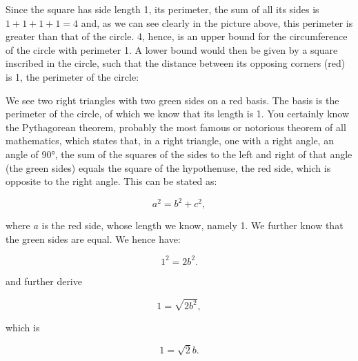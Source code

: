 \documentclass[tikz]{scrreprt}
\begin{document}
\begin{center}
\end{center}

Since the square has side length 1,
its perimeter, the sum of all its sides is
$1+1+1+1 = 4$ and, as we can see clearly
in the picture above, this perimeter
is greater than that of the circle.
4, hence, is an upper bound for the circumference
of the circle with perimeter 1.
A lower bound would then be given
by a square inscribed in the circle,
such that the distance between 
its opposing corners (red) is 1, the perimeter
of the circle:

\begin{center}
\end{center}

We see two right triangles with two green sides 
on a red basis. The basis is the perimeter
of the circle, of which we know that its length is 1.
You certainly know the Pythagorean theorem,
probably the most famous or notorious theorem of all mathematics,
which states that, in a right triangle,
one with a right angle, an angle of 90°, the sum of the squares
of the sides to the left and right of that angle (the green sides)
equals the square of the hypothenuse, the red side,
which is opposite to the right angle.
This can be stated as:

\begin{equation}
a^2 = b^2 + c^2,
\end{equation}

where $a$ is the red side, whose length we know,
namely 1. We further know that the green sides
are equal. We hence have:

\begin{equation}
1^2 = 2b^2.
\end{equation}

and further derive

\begin{equation}
1 = \sqrt{2b^2},
\end{equation}

which is

\begin{equation}
1 = \sqrt{2}b.
\end{equation}
\end{document}
